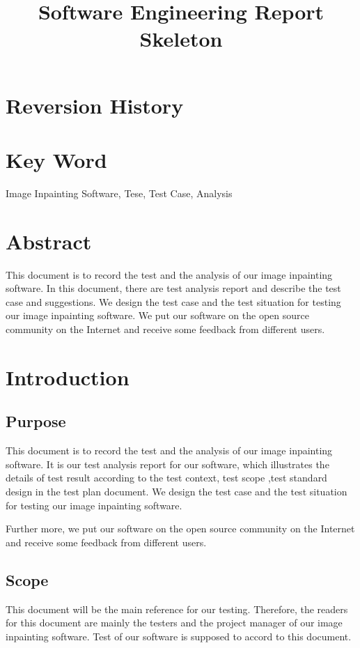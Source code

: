 \documentclass[12pt]{article}
\title{Software Engineering Report Skeleton}
\begin{document}
\maketitle

\section*{Reversion History}
\section*{Key Word} Image Inpainting Software, Tese, Test Case, Analysis
\section*{Abstract}
\qquad This document is to record the test and the analysis of our image inpainting software. In this document, there are test analysis report and describe the test case and suggestions. We design the test case and the test situation for testing our image inpainting software. We put our software on the open source community on the Internet and receive some feedback from different users.

\newpage
\tableofcontents
\newpage

\section{Introduction}
\subsection{Purpose}
\qquad This document is to record the test and the analysis of our image inpainting software. It is our test analysis report for our software, which illustrates the details of test result according to the test context, test scope ,test standard design in the test plan document. We design the test case and the test situation for testing our image inpainting software.

Further more, we put our software on the open source community on the Internet and receive some feedback from different users.
\subsection{Scope}
\qquad This document will be the main reference for our testing. Therefore, the readers for this document are mainly the testers and the project manager of our image inpainting software. Test of our software is supposed to accord to this document.
\end{document}
